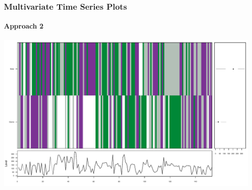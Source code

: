 \begin{frame}[fragile]
 \frametitle{Multivariate Time Series Plots}
 \framesubtitle{Approach 2}

       \begin{center}
         \includegraphics[width=1\textwidth]{images/Mtvsplot2.pdf}
        \end{center}
\end{frame}

%
%
%


